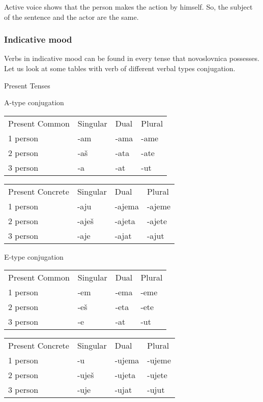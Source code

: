Active voice shows that the person makes the action by himself. So, the subject of the sentence and the actor are the same.

\subsubsection{Indicative mood}

Verbs in indicative mood can be found in every tense that novoslovnica possesses. Let us look at some tables with verb of different verbal types conjugation.

Present Tenses

A-type conjugation

\begin{table}[h]
	\begin{tabular}{llll}
		Present Common & Singular & Dual & Plural \\
		1 person & -am & -ama & -ame \\
		2 person & -aš & -ata & -ate \\
		3 person & -a & -at & -ut
	\end{tabular}
\end{table}


\begin{table}[h]
	\begin{tabular}{llll}
		Present Concrete & Singular & Dual & Plural \\
		1 person & -aju & -ajema & -ajeme \\
		2 person & -aješ & -ajeta & -ajete \\
		3 person & -aje & -ajat & -ajut
	\end{tabular}
\end{table}

E-type conjugation

\begin{table}[h]
	\begin{tabular}{llll}
		Present Common & Singular & Dual & Plural \\
		1 person & -em & -ema & -eme \\
		2 person & -eš & -eta & -ete \\
		3 person & -e & -at & -ut
	\end{tabular}
\end{table}


\begin{table}[h]
	\begin{tabular}{llll}
		Present Concrete & Singular & Dual & Plural \\
		1 person & -u & -ujema & -ujeme \\
		2 person & -uješ & -ujeta & -ujete \\
		3 person & -uje & -ujat & -ujut
	\end{tabular}
\end{table}


